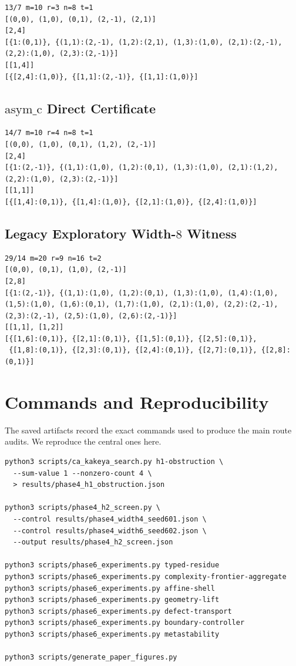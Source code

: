 \documentclass[11pt]{article}
\theoremstyle{definition}
\begin{document}
\begin{verbatim}
13/7 m=10 r=3 n=8 t=1
[(0,0), (1,0), (0,1), (2,-1), (2,1)]
[2,4]
[{1:(0,1)}, {(1,1):(2,-1), (1,2):(2,1), (1,3):(1,0), (2,1):(2,-1),
(2,2):(1,0), (2,3):(2,-1)}]
[[1,4]]
[{[2,4]:(1,0)}, {[1,1]:(2,-1)}, {[1,1]:(1,0)}]
\end{verbatim}

\subsection{\texorpdfstring{$\mathrm{asym\_c}$}{asym\_c} Direct Certificate}

\begin{verbatim}
14/7 m=10 r=4 n=8 t=1
[(0,0), (1,0), (0,1), (1,2), (2,-1)]
[2,4]
[{1:(2,-1)}, {(1,1):(1,0), (1,2):(0,1), (1,3):(1,0), (2,1):(1,2),
(2,2):(1,0), (2,3):(2,-1)}]
[[1,1]]
[{[1,4]:(0,1)}, {[1,4]:(1,0)}, {[2,1]:(1,0)}, {[2,4]:(1,0)}]
\end{verbatim}

\subsection{Legacy Exploratory Width-\texorpdfstring{$8$}{8} Witness}

\begin{verbatim}
29/14 m=20 r=9 n=16 t=2
[(0,0), (0,1), (1,0), (2,-1)]
[2,8]
[{1:(2,-1)}, {(1,1):(1,0), (1,2):(0,1), (1,3):(1,0), (1,4):(1,0),
(1,5):(1,0), (1,6):(0,1), (1,7):(1,0), (2,1):(1,0), (2,2):(2,-1),
(2,3):(2,-1), (2,5):(1,0), (2,6):(2,-1)}]
[[1,1], [1,2]]
[{[1,6]:(0,1)}, {[2,1]:(0,1)}, {[1,5]:(0,1)}, {[2,5]:(0,1)},
 {[1,8]:(0,1)}, {[2,3]:(0,1)}, {[2,4]:(0,1)}, {[2,7]:(0,1)}, {[2,8]:(0,1)}]
\end{verbatim}

\section{Commands and Reproducibility}
\label{app:repro}

The saved artifacts record the exact commands used to produce the main route audits. We reproduce the central ones here.

\begin{verbatim}
python3 scripts/ca_kakeya_search.py h1-obstruction \
  --sum-value 1 --nonzero-count 4 \
  > results/phase4_h1_obstruction.json

python3 scripts/phase4_h2_screen.py \
  --control results/phase4_width4_seed601.json \
  --control results/phase4_width6_seed602.json \
  --output results/phase4_h2_screen.json

python3 scripts/phase6_experiments.py typed-residue
python3 scripts/phase6_experiments.py complexity-frontier-aggregate
python3 scripts/phase6_experiments.py affine-shell
python3 scripts/phase6_experiments.py geometry-lift
python3 scripts/phase6_experiments.py defect-transport
python3 scripts/phase6_experiments.py boundary-controller
python3 scripts/phase6_experiments.py metastability

python3 scripts/generate_paper_figures.py
\end{verbatim}
\end{document}
